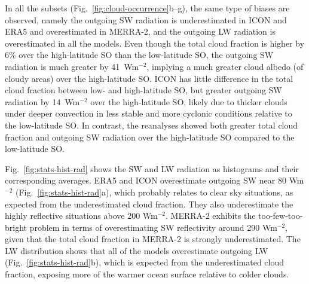 \documentclass[draft]{agujournal2019}
\begin{document}
In all the subsets (Fig.~\ref{fig:cloud-occurrence}b–g), the same type of biases are observed, namely the outgoing SW radiation is underestimated in ICON and ERA5 and overestimated in MERRA-2, and the outgoing LW radiation is overestimated in all the models. Even though the total cloud fraction is higher by 6\% over the high-latitude SO than the low-latitude SO, the outgoing SW radiation is much greater by 41~Wm$^{-2}$, implying a much greater cloud albedo (of cloudy areas) over the high-latitude SO. ICON has little difference in the total cloud fraction between low- and high-latitude SO, but greater outgoing SW radiation by 14~Wm$^{-2}$ over the high-latitude SO, likely due to thicker clouds under deeper convection in less stable and more cyclonic conditions relative to the low-latitude SO. In contrast, the reanalyses showed both greater total cloud fraction and outgoing SW radiation over the high-latitude SO compared to the low-latitude SO.


Fig.~\ref{fig:stats-hist-rad} shows the SW and LW radiation as histograms and their corresponding averages. ERA5 and ICON overestimate outgoing SW near 80 Wm$^{-2}$ (Fig.~\ref{fig:stats-hist-rad}a), which probably relates to clear sky situations, as expected from the underestimated cloud fraction. They also underestimate the highly reflective situations above 200 Wm$^{-2}$. MERRA-2 exhibits the too-few-too-bright problem in terms of overestimating SW reflectivity around 290 Wm$^{-2}$, given that the total cloud fraction in MERRA-2 is strongly underestimated. The LW distribution shows that all of the models overestimate outgoing LW (Fig.~\ref{fig:stats-hist-rad}b), which is expected from the underestimated cloud fraction, exposing more of the warmer ocean surface relative to colder clouds.
\end{document}
